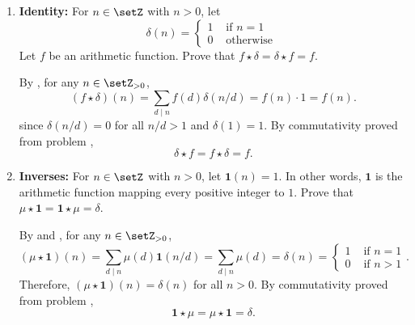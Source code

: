 \begin{enumerate}
\begin{enumerate}
    \newpage

    \item \textbf{Identity:} For $n \in \setZ$ with $n>0$, let
    \[
    \delta(n)= \begin{cases}1 & \text { if } n=1 \\ 0 & \text { otherwise }\end{cases}
    \]
    Let $f$ be an arithmetic function. Prove that $f \star \delta=\delta \star f=f$.
    \label{prob:3.6.69-c}
    \begin{subprove}
      By , for any $n \in \setZ_{>0}$,
      \[
      (f \star \delta)(n) = \sum_{d \mid n} f(d) \delta(n/d) = f(n) \cdot 1 = f(n).
      \]
      since \(\delta(n/d) = 0\) for all \(n/d > 1\) and \(\delta(1) = 1\).
      By commutativity proved from problem ,
      \[
      \delta \star f = f \star \delta = f.
      \]
    \end{subprove}

    \item \textbf{Inverses:} For $n \in \setZ$ with $n>0$, let $\mathbf{1}(n)=1$. 
    In other words, $\mathbf{1}$ is the arithmetic function mapping every positive 
    integer to $1$. Prove that $\mu \star \mathbf{1}=\mathbf{1} \star \mu=\delta$.
    \label{prob:3.6.69-d}
    \begin{subprove}
      By  and , for any $n \in \setZ_{>0}$,
      \[
      (\mu \star \mathbf{1})(n) = \sum_{d \mid n} \mu(d) \mathbf{1}(n/d) 
      = \sum_{d \mid n} \mu(d)
      = \delta(n)
      =\begin{cases}
        1 & \text { if } n=1 \\ 
        0 & \text { if } n>1
      \end{cases}.
      \]
      Therefore, $(\mu \star \mathbf{1})(n) = \delta(n)$ for all $n > 0$.
      By commutativity proved from problem ,
      \[
      \mathbf{1} \star \mu = \mu \star \mathbf{1} = \delta.
      \]
    \end{subprove}


\end{enumerate}
\end{enumerate}

